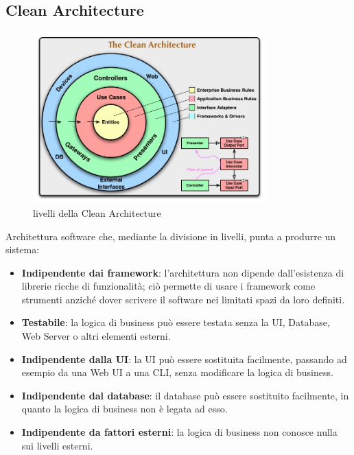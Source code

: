 \documentclass[a4paper]{article}
\begin{document}
\subsection{Clean Architecture}
\begin{figure}[ht]
    \centering
    \includegraphics[width=0.8\textwidth]{Risorse/CleanArchitecture.jpg}
    \caption{livelli della Clean Architecture}
\end{figure}
Architettura software che, mediante la divisione in livelli, punta a produrre un sistema:
\begin{itemize}
    \item{\textbf{Indipendente dai framework}}: l'architettura non dipende dall'esistenza di librerie ricche di funzionalità; ciò permette di usare i framework come strumenti anziché dover scrivere il software nei limitati spazi da loro definiti.
    
    \item{\textbf{Testabile}}: la logica di business può essere testata senza la UI, Database, Web Server o altri elementi esterni.
    
    \item{\textbf{Indipendente dalla UI}}: la UI può essere sostituita facilmente, passando ad esempio da una Web UI a una CLI, senza modificare la logica di business.
    
    \item{\textbf{Indipendente dal database}}: il database può essere sostituito facilmente, in quanto la logica di business non è legata ad esso.
    
    \item{\textbf{Indipendente da fattori esterni}}: la logica di business non conosce nulla sui livelli esterni.\cite{clean_architecture}
\end{itemize}
\end{document}
